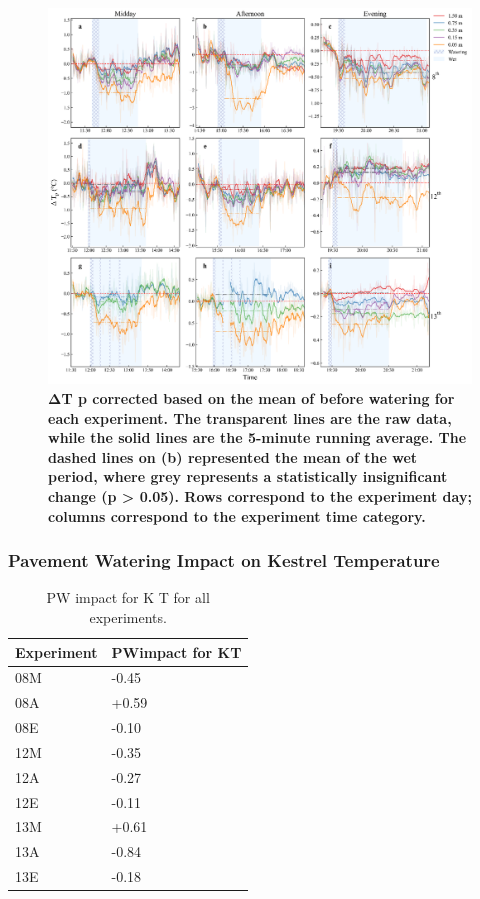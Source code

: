 \documentclass[final,3p,times,authoryear]{elsarticle}
\begin{document}
{\begin{figure}
\centering
\includegraphics[trim={0 0 0 0},clip,scale=1.0]{pict043.png}
\caption{\bf ΔT p corrected based on the mean of before watering for each experiment. The transparent
lines are the raw data, while the solid lines are the 5-minute running average. The dashed lines on (b)
represented the mean of the wet period, where grey represents a statistically insignificant change (p >
0.05). Rows correspond to the experiment day; columns correspond to the experiment time category.}
 \label{fig:7.14}
\end{figure}


\subsubsection{Pavement Watering Impact on Kestrel Temperature}\label{sec:appendix7.5.7}

\begin{table}[!ht]\caption{PW impact for K T for all experiments.}
    \centering
    \begin{tabular}{|l|l|}
    \hline
        Experiment & PWimpact for KT \\ \hline
        08M & -0.45 \\ \hline
        08A & +0.59 \\ \hline
        08E & -0.10 \\ \hline
        12M & -0.35 \\ \hline
        12A & -0.27 \\ \hline
        12E & -0.11 \\ \hline
        13M & +0.61 \\ \hline
        13A & -0.84 \\ \hline
        13E & -0.18 \\ \hline
    \end{tabular}\label{table:7.4}
\end{table}


}
\end{document}
